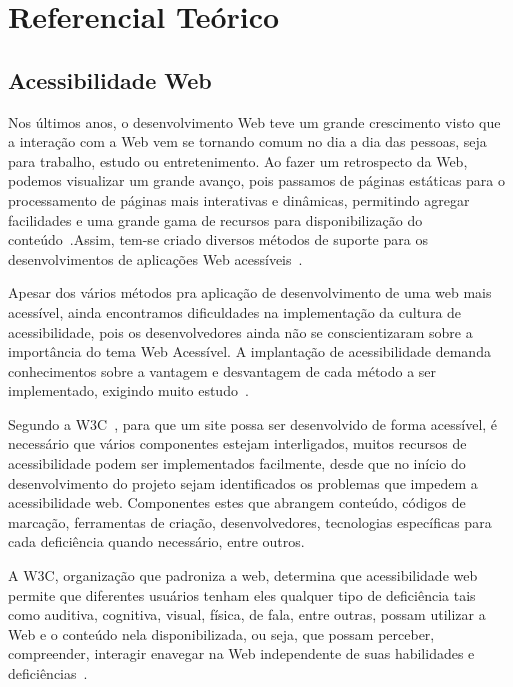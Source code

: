 \section{Referencial Te\'orico}
\label{sec:referencialTeorico}


\subsection{Acessibilidade Web}
\label{subsec:AcessibilidadeWeb}

Nos \'ultimos anos, o desenvolvimento Web teve um grande crescimento visto que
a intera\c{c}\~ao com a Web vem se tornando comum no dia a dia das pessoas, seja para
trabalho, estudo ou entretenimento. Ao fazer um retrospecto da Web, podemos
visualizar um grande avan\c{c}o, pois passamos de p\'aginas est\'aticas para o
processamento de p\'aginas mais interativas e din\^amicas, permitindo agregar
facilidades e uma grande gama de recursos para disponibiliza\c{c}\~ao do
conte\'udo~\cite{Jazayeri}.Assim, tem-se criado diversos m\'etodos de suporte
para os desenvolvimentos de aplica\c{c}\~oes Web acess\'iveis~\cite{Freire}.

Apesar dos v\'arios m\'etodos pra aplica\c{c}\~ao de desenvolvimento de uma web
mais acess\' ivel, ainda encontramos dificuldades na implementa\c{c}\~ao da
cultura de acessibilidade, pois os desenvolvedores ainda n\~ao se conscientizaram sobre a
import\^ancia do tema Web Acess\'ivel. A implanta\c{c}\~ao de acessibilidade
demanda conhecimentos sobre a vantagem e desvantagem de cada m\'etodo a ser implementado,
exigindo muito estudo~\cite{Freire}.    
 
Segundo a W3C~\cite{WAI}, para que um site possa ser desenvolvido de forma
acess\'ivel, \'e necess\'ario que v\'arios componentes estejam interligados, muitos recursos de
acessibilidade podem ser implementados facilmente, desde que no in\'icio do
desenvolvimento do projeto sejam identificados os problemas que impedem a
acessibilidade web. Componentes estes que abrangem conte\'udo, c\'odigos de
marca\c{c}\~ao, ferramentas de cria\c{c}\~ao, desenvolvedores, tecnologias
espec\'ificas para cada defici\^encia quando necess\'ario, entre outros.

A W3C, organiza\c{c}\~ao que padroniza a web,
determina que acessibilidade web permite que diferentes usu\'arios tenham eles
qualquer tipo de defici\^encia tais como auditiva, cognitiva, visual,
f\'isica, de fala, entre outras, possam utilizar a Web e o conte\'udo nela
disponibilizada, ou seja, que possam perceber, compreender, interagir enavegar
na Web independente de suas habilidades e defici\^encias~\cite{WAI/W3C}.

